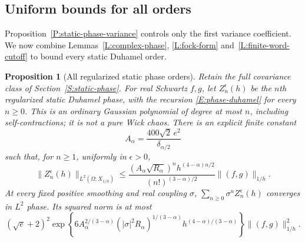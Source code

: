 \documentclass[12pt,oneside,openany]{book}
\makeatletter
\let\lean@pending\@empty
\newcommand{\LeanMarker}[1]{\gdef\lean@pending{#1}}
\numberwithin{equation}{section}
\newtheorem{proposition}[theorem]{Proposition}
\theoremstyle{nogostyle}
\theoremstyle{definition}
\makeatother
\begin{document}


\subsection{Uniform bounds for all orders}

Proposition~\ref{P:static-phase-variance} controls only the first variance
coefficient. We now combine Lemmas~\ref{L:complex-phase}, \ref{L:fock-form}
and~\ref{L:finite-word-cutoff} to bound every static Duhamel order.

\LeanMarker{P:static-phase-all-orders}
\begin{proposition}[All regularized static phase orders]
  \label{P:static-phase-all-orders}
  Retain the full covariance class of Section~\ref{S:static-phase}. For real
  Schwartz $f,g$, let $Z_n^\epsilon(h)$ be the $n$th regularized static Duhamel
  phase, with the recursion \eqref{E:phase-duhamel} for every $n \ge 0$. This is
  an ordinary Gaussian polynomial of degree at most $n$, including
  self-contractions; it is not a pure Wick chaos. There is an explicit finite
  constant
  \[
    A_\alpha=\frac{400\sqrt2\,e^2}{\delta_{\alpha/2}}
  \]
  such that, for $n \ge 1$, uniformly in $\epsilon > 0$,
  \begin{equation}\label{E:all-static-phase-orders}
    \|Z_n^\epsilon(h)\|_{L^2(\Omega;X_{1/h})}
    \le
    \frac{(A_\alpha\sqrt{R_\alpha})^n
    h^{(4-\alpha)n/2}}{(n!)^{(3-\alpha)/2}}
    \|(f,g)\|_{1/h}.
  \end{equation}
  At every fixed positive smoothing and real coupling $\sigma$,
  $\sum_{n\ge0}\sigma^nZ_n^\epsilon(h)$ converges in $L^2$ phase. Its squared
  norm is at most
  \begin{equation}\label{E:all-static-phase-sum}
    (\sqrt e+2)^2
    \exp\left\{6A_\alpha^{2/(3-\alpha)}
    (|\sigma|^2R_\alpha)^{1/(3-\alpha)}
    h^{(4-\alpha)/(3-\alpha)}\right\}\|(f,g)\|_{1/h}^2.
  \end{equation}
\end{proposition}
\end{document}

